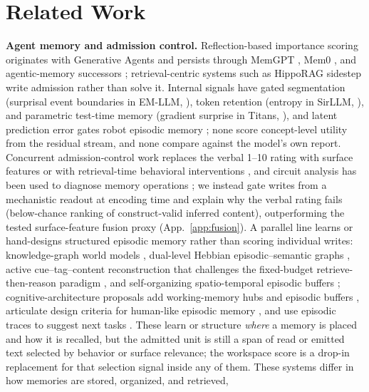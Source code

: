 \section{Related Work}
\label{sec:related}

\textbf{Agent memory and admission control.}
Reflection-based importance scoring originates with Generative Agents
\citep{park2023generative} and persists through MemGPT
\citep{packer2023memgpt}, Mem0 \citep{mem0}, and agentic-memory successors
\citep{amem2025}; retrieval-centric systems such as HippoRAG
\citep{hipporag2024} sidestep write admission rather than solve it. Internal signals have gated segmentation (surprisal event
boundaries in EM-LLM, \citealp{fostiropoulos2024emllm}), token retention (entropy in
SirLLM, \citealp{yao2024sirllm}), and parametric test-time memory (gradient surprise
in Titans, \citealp{behrouz2025titans}), and latent prediction error gates robot
episodic memory \citep{surpriserobot2026}; none score concept-level utility
from the residual stream, and none compare against the model's own report.
Concurrent admission-control work replaces the verbal 1--10 rating with surface
features \citep{amac2026,valuemodel2026} or with retrieval-time behavioral
interventions \citep{cmi2026}, and circuit analysis has been used to
diagnose memory operations \citep{memcircuits2026}; we instead gate writes
from a mechanistic readout at encoding time and explain why the verbal
rating fails (below-chance ranking of construct-valid inferred content), outperforming the tested surface-feature fusion proxy (App.~\ref{app:fusion}).
A parallel line learns or hand-designs structured episodic memory rather than
scoring individual writes: knowledge-graph world models
\citep{arigraph2024}, dual-level Hebbian episodic--semantic graphs
\citep{helamem2026}, active cue--tag--content reconstruction that challenges
the fixed-budget retrieve-then-reason paradigm \citep{mragent2026}, and
self-organizing spatio-temporal episodic buffers \citep{artem2026};
cognitive-architecture proposals add working-memory hubs and episodic buffers
\citep{guo2024wm}, articulate design criteria for human-like episodic memory
\citep{dong2025episodic}, and use episodic traces to suggest next tasks
\citep{fiorini2025episodic}. These learn or structure \emph{where} a memory is
placed and how it is recalled, but the admitted unit is still a span of read
or emitted text selected by behavior or surface relevance; the workspace score
is a drop-in replacement for that selection signal inside any of them.
These systems differ in how memories are stored, organized, and retrieved,
